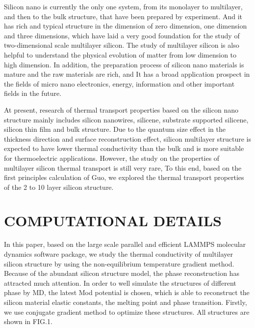 \documentclass[%
 reprint,
 amsmath,amssymb,
 aps,
prb,
]{revtex4-1}
\begin{document}
Silicon nano is currently the only one system, from its monolayer to multilayer, and then to the bulk structure, that have been prepared by experiment. And it has rich and typical structure in the dimension of zero dimension, one dimension and three dimensions, which have laid a very good foundation for the study of two-dimensional scale multilayer silicon. The study of multilayer silicon is also helpful to understand the physical evolution of matter from low dimension to high dimension. In addition, the preparation process of silicon nano materials is mature and the raw materials are rich, and It has a broad application prospect in the fields of micro nano electronics, energy, information and other important fields in the future.

At present, research of thermal transport properties based on the silicon nano structure mainly includes silicon nanowires\cite{Hochbaum2008,Yang2010,Shi2009,Boukai2008}, silicene\cite{Pei2013,Ng2013,Xie2014,Zhang2014,Liu2014}, substrate supported silicene\cite{Wang2015,Zhang2015a}, silicon thin film and bulk structure\cite{Bodapati2006,Tang2013Thermal,Jeong2012Thermal,Liu2006Thermal,Wang2006Lattice}. Due to the quantum size effect in the thickness direction and surface reconstruction effect, silicon multilayer structure is expected to have lower thermal conductivity than the bulk and is more suitable for thermoelectric applications. However, the study on the properties of multilayer silicon thermal transport is still very rare, To this end, based on the first principles calculation of Guo\cite{Guo2015Structural}, we explored the thermal transport properties of the 2 to 10 layer silicon structure.

\section{COMPUTATIONAL DETAILS}

In this paper, based on the large scale parallel and efficient LAMMPS molecular dynamics software package, we study the thermal conductivity of multilayer silicon structure by using the non-equilibrium temperature gradient method. Because of the abundant silicon structure model, the phase reconstruction has attracted much attention. In order to well simulate the structures of different phase by MD, the latest Mod potential is chosen\cite{Kumagai2007Development}, which is able to reconstruct the silicon material elastic constants, the melting point and phase transition. Firstly, we use conjugate gradient method to optimize these structures. All structures are shown in FIG.1.
\end{document}
